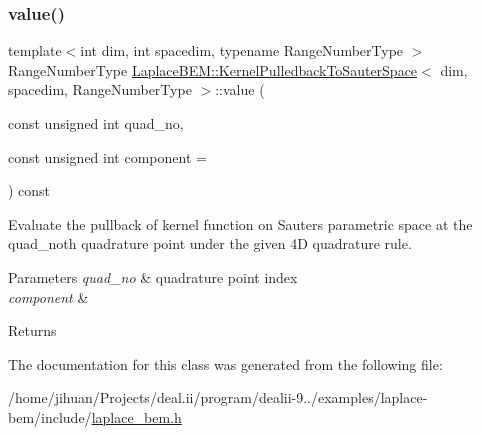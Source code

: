\subsubsection{\texorpdfstring{value()}{value()}\hspace{0.1cm}{\footnotesize\ttfamily [2/2]}}
{\footnotesize\ttfamily template$<$int dim, int spacedim, typename Range\+Number\+Type $>$ \\
Range\+Number\+Type \hyperlink{classLaplaceBEM_1_1KernelPulledbackToSauterSpace}{Laplace\+B\+E\+M\+::\+Kernel\+Pulledback\+To\+Sauter\+Space}$<$ dim, spacedim, Range\+Number\+Type $>$\+::value (\begin{DoxyParamCaption}\item[{const unsigned int}]{quad\+\_\+no,  }\item[{const unsigned int}]{component = {} }\end{DoxyParamCaption}) const}

Evaluate the pullback of kernel function on Sauter\textquotesingle{}s parametric space at the quad\+\_\+no\textquotesingle{}th quadrature point under the given 4D quadrature rule. 
\begin{DoxyParams}{Parameters}
{\em quad\+\_\+no} & quadrature point index \\
\hline
{\em component} & \\
\hline
\end{DoxyParams}
\begin{DoxyReturn}{Returns}

\end{DoxyReturn}


The documentation for this class was generated from the following file\+:\begin{DoxyCompactItemize}
\item 
/home/jihuan/\+Projects/deal.\+ii/program/dealii-\/9../examples/laplace-\/bem/include/\hyperlink{laplace__bem_8h}{laplace\+\_\+bem.\+h}\end{DoxyCompactItemize}
